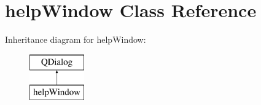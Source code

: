 \hypertarget{classhelp_window}{}\section{help\+Window Class Reference}
\label{classhelp_window}
Inheritance diagram for help\+Window\+:\begin{figure}[H]
\begin{center}
\leavevmode
\includegraphics[height=2.000000cm]{classhelp_window}
\end{center}
\end{figure}
